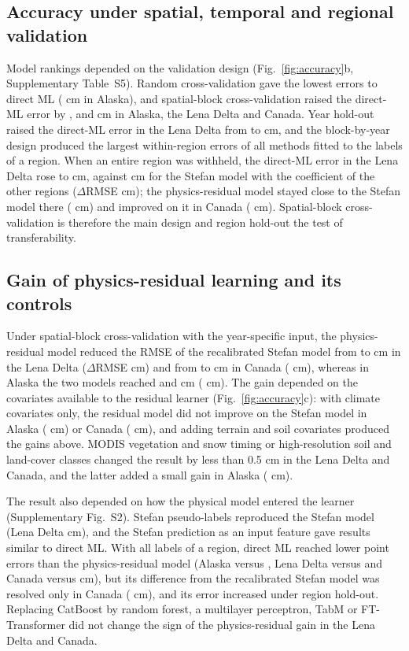 \subsection{Accuracy under spatial, temporal and regional validation}
Model rankings depended on the validation design (Fig.~\ref{fig:accuracy}b, Supplementary Table~S5). Random cross-validation gave the lowest errors to direct ML (\nrmseAkrandDz{} cm in Alaska), and spatial-block cross-validation raised the direct-ML error by \noptimAkDz, \noptimLeDz{} and \noptimCaDz{} cm in Alaska, the Lena Delta and Canada. Year hold-out raised the direct-ML error in the Lena Delta from \nrmseLeblkDz{} to \nrmseLeyrDz{} cm, and the block-by-year design produced the largest within-region errors of all methods fitted to the labels of a region. When an entire region was withheld, the direct-ML error in the Lena Delta rose to \nrmseLeregDz{} cm, against \nrmseLeregPz{} cm for the Stefan model with the coefficient of the other regions ($\Delta$RMSE \ndrefLeregDz{} cm); the physics-residual model stayed close to the Stefan model there (\ndrefLeregRo{} cm) and improved on it in Canada (\ndrefCaregRo{} cm). Spatial-block cross-validation is therefore the main design and region hold-out the test of transferability.

\subsection{Gain of physics-residual learning and its controls}
Under spatial-block cross-validation with the year-specific input, the physics-residual model reduced the RMSE of the recalibrated Stefan model from \nrmseLeblkPo{} to \nrmseLeblkRo{} cm in the Lena Delta ($\Delta$RMSE \ndrefLeblkRo{} cm) and from \nrmseCablkPo{} to \nrmseCablkRo{} cm in Canada (\ndrefCablkRo{} cm), whereas in Alaska the two models reached \nrmseAkblkPo{} and \nrmseAkblkRo{} cm (\ndrefAkblkRo{} cm). The gain depended on the covariates available to the residual learner (Fig.~\ref{fig:accuracy}c): with climate covariates only, the residual model did not improve on the Stefan model in Alaska (\ndfeatAkFclim{} cm) or Canada (\ndfeatCaFclim{} cm), and adding terrain and soil covariates produced the gains above. MODIS vegetation and snow timing or high-resolution soil and land-cover classes changed the result by less than 0.5 cm in the Lena Delta and Canada, and the latter added a small gain in Alaska (\ndfeatAkFhires{} cm).

The result also depended on how the physical model entered the learner (Supplementary Fig.~S2). Stefan pseudo-labels reproduced the Stefan model (Lena Delta \ndrefLeblkDo{} cm), and the Stefan prediction as an input feature gave results similar to direct ML. With all labels of a region, direct ML reached lower point errors than the physics-residual model (Alaska \nrmseAkblkDz{} versus \nrmseAkblkRo, Lena Delta \nrmseLeblkDz{} versus \nrmseLeblkRo{} and Canada \nrmseCablkDz{} versus \nrmseCablkRo{} cm), but its difference from the recalibrated Stefan model was resolved only in Canada (\ndrefCablkDz{} cm), and its error increased under region hold-out. Replacing CatBoost by random forest, a multilayer perceptron, TabM or FT-Transformer did not change the sign of the physics-residual gain in the Lena Delta and Canada.

